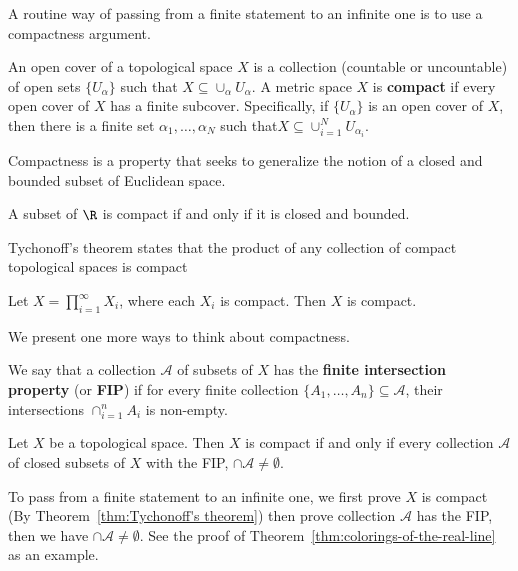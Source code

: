 A routine way of passing from a finite statement to an infinite one is to use a compactness argument.

\begin{defn}
An open cover of a topological space $X$ is a collection (countable or uncountable) of open sets $\{U_\alpha\}$ such that $X\subseteq \cup_\alpha U_\alpha$. A metric space $X$ is \textbf{compact} if every open cover of $X$ has a finite subcover. Specifically, if $\{U_\alpha\}$ is an open cover of $X$, then there is a finite set $\alpha_1,\ldots,\alpha_N$ such that$X\subseteq \cup_{i=1}^N U_{\alpha_i}$.
\end{defn}
Compactness is a property that seeks to generalize the notion of a closed and bounded subset of Euclidean space.
\begin{thm}
A subset of $\R$ is compact if and only if it is closed and bounded.
\end{thm}
Tychonoff's theorem states that the product of any collection of compact topological spaces is compact
\begin{thm}\label{thm:Tychonoff's theorem}
Let $X = \prod_{i=1}^\infty X_i$, where each $X_i$ is compact. Then $X$ is compact.
\end{thm}

We present one more ways to think about compactness.
\begin{defn}
We say that a collection $\mathcal{A}$ of subsets of $X$ has the \textbf{finite intersection property} (or \textbf{FIP}) if for every finite collection $\{A_1,\ldots,A_n\}\subseteq \mathcal{A}$, their intersections $\cap_{i=1}^n A_i$ is non-empty.
\end{defn}
\begin{thm}\label{thm:compact-FIP}
Let $X$ be a topological space. Then $X$ is compact if and only if every collection $\mathcal{A}$ of closed subsets of $X$ with the FIP, $\cap\mathcal{A}\neq \emptyset$.    
\end{thm}
\begin{tcolorbox}[pikachu]
To pass from a finite statement to an infinite one, we first prove $X$ is compact (By Theorem~\ref{thm:Tychonoff's theorem}) then prove collection $\mathcal{A}$ has the FIP, then we have $\cap\mathcal{A}\neq\emptyset$. See the proof of Theorem~\ref{thm:colorings-of-the-real-line} as an example.
\end{tcolorbox}


